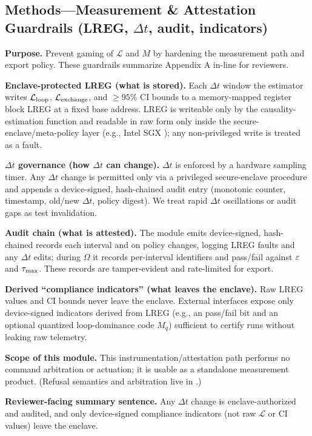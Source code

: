 \documentclass[11pt]{article}
\begin{document}
\subsection{Methods---Measurement \& Attestation Guardrails (LREG, $\Delta t$, audit, indicators)}
\label{sec:method_guardrails}

\textbf{Purpose.} Prevent gaming of $\mathcal{L}$ and $M$ by hardening the measurement path and export policy. These guardrails summarize Appendix A in-line for reviewers.

\textbf{Enclave-protected LREG (what is stored).} Each $\Delta t$ window the estimator writes $\mathcal{L}_{\text{loop}}$, $\mathcal{L}_{\text{exchange}}$, and $\geq 95\%$ CI bounds to a memory-mapped register block LREG at a fixed base address. LREG is writeable only by the causality-estimation function and readable in raw form only inside the secure-enclave/meta-policy layer (e.g., Intel SGX \cite{costan2016intel}); any non-privileged write is treated as a fault.

\textbf{$\Delta t$ governance (how $\Delta t$ can change).} $\Delta t$ is enforced by a hardware sampling timer. Any $\Delta t$ change is permitted only via a privileged secure-enclave procedure and appends a device-signed, hash-chained audit entry (monotonic counter, timestamp, old/new $\Delta t$, policy digest). We treat rapid $\Delta t$ oscillations or audit gaps as test invalidation.

\textbf{Audit chain (what is attested).} The module emits device-signed, hash-chained records \cite{haber1991time,merkle1988digital} each interval and on policy changes, logging LREG faults and any $\Delta t$ edits; during $\Omega$ it records per-interval identifiers and pass/fail against $\varepsilon$ and $\tau_{\max}$. These records are tamper-evident and rate-limited for export.

\textbf{Derived ``compliance indicators'' (what leaves the enclave).} Raw LREG values and CI bounds never leave the enclave. External interfaces expose only device-signed indicators derived from LREG (e.g., an \NC pass/fail bit and an optional quantized loop-dominance code $M_q$) sufficient to certify runs without leaking raw telemetry.

\textbf{Scope of this module.} This instrumentation/attestation path performs no command arbitration or actuation; it is usable as a standalone measurement product. (Refusal semantics and arbitration live in .)

\textbf{Reviewer-facing summary sentence.} Any $\Delta t$ change is enclave-authorized and audited, and only device-signed compliance indicators (not raw $\mathcal{L}$ or CI values) leave the enclave.
\end{document}
